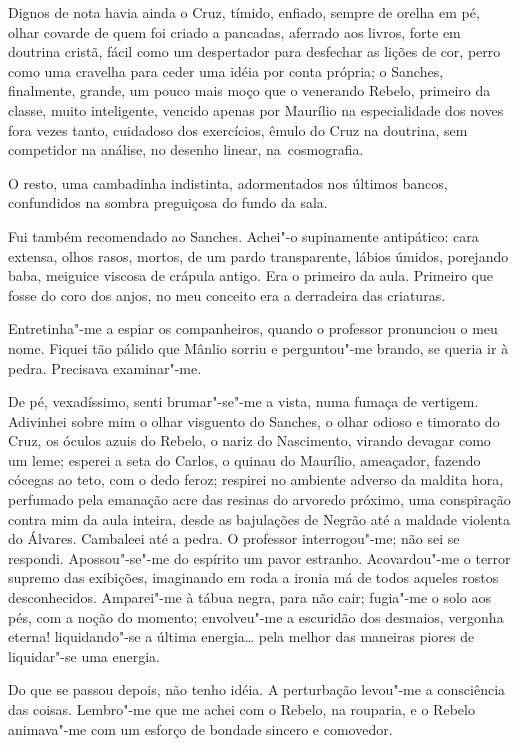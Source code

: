 Dignos de nota havia ainda o Cruz, tímido, enfiado, sempre de orelha em
pé, olhar covarde de quem foi criado a pancadas, aferrado aos livros,
forte em doutrina cristã, fácil como um despertador para desfechar as
lições de cor, perro como uma cravelha para ceder uma idéia por conta
própria; o Sanches, finalmente, grande, um pouco mais moço que o
venerando Rebelo, primeiro da classe, muito inteligente, vencido apenas
por Maurílio na especialidade dos noves fora vezes tanto, cuidadoso dos
exercícios, êmulo do Cruz na doutrina, sem competidor na análise, no
desenho linear, \mbox{na cosmografia.} 

O resto, uma cambadinha indistinta,
adormentados nos últimos bancos, confundidos na sombra preguiçosa do
fundo da sala. 

Fui também recomendado ao Sanches. Achei"-o supinamente
antipático: cara extensa, olhos rasos, mortos, de um pardo
transparente, lábios úmidos, porejando baba, meiguice viscosa de
crápula antigo. Era o primeiro da aula. Primeiro que fosse do coro dos
anjos, no meu conceito era a derradeira das criaturas. 

Entretinha"-me a espiar os companheiros, quando o professor pronunciou o meu nome.
Fiquei tão pálido que Mânlio sorriu e perguntou"-me brando, se queria
ir à pedra. Precisava examinar"-me. 


De pé, vexadíssimo, senti
brumar"-se"-me a vista, numa fumaça de vertigem. Adivinhei sobre mim
o olhar visguento do Sanches, o olhar odioso e timorato do Cruz, os
óculos azuis do Rebelo, o nariz do Nascimento, virando devagar como um leme; 
esperei a seta do Carlos, o
quinau do Maurílio, ameaçador, fazendo cócegas ao teto, com o dedo
feroz; respirei no ambiente adverso da maldita hora, perfumado pela
emanação acre das resinas do arvoredo próximo, uma conspiração contra
mim da aula inteira, desde as bajulações de Negrão até a maldade
violenta do Álvares. Cambaleei até a pedra. O professor
interrogou"-me; não sei se respondi. Apossou"-se"-me do espírito um
pavor estranho. Acovardou"-me o terror supremo das exibições,
imaginando em roda a ironia má de todos aqueles rostos desconhecidos.
Amparei"-me à tábua negra, para não cair; fugia"-me o solo aos pés,
com a noção do momento; envolveu"-me a escuridão dos desmaios,
vergonha eterna! liquidando"-se a última energia\ldots{} pela melhor das
maneiras piores de liquidar"-se uma energia.

Do que se passou depois,
não tenho idéia. A perturbação levou"-me a consciência das coisas.
Lembro"-me que me achei com o Rebelo, na rouparia, e o Rebelo
animava"-me com um esforço de bondade sincero e comovedor. 

